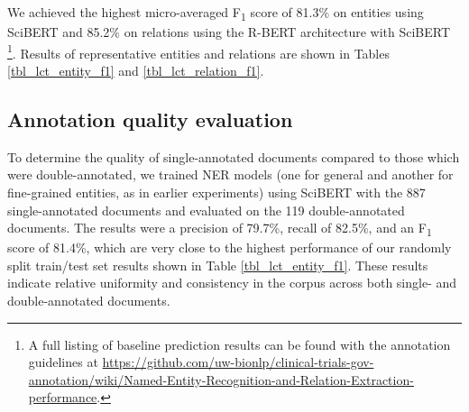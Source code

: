 \documentclass[../main.tex]{subfiles}
\begin{document}
We achieved the highest micro-averaged F\textsubscript{1} score of 81.3\% on entities using SciBERT and 85.2\% on relations using the R-BERT architecture with SciBERT \footnote{A full listing of baseline prediction results can be found with the annotation guidelines at \url{https://github.com/uw-bionlp/clinical-trials-gov-annotation/wiki/Named-Entity-Recognition-and-Relation-Extraction-performance}. }. Results of representative entities and relations are shown in Tables \ref{tbl_lct_entity_f1} and \ref{tbl_lct_relation_f1}.

\begin{table}[tp]
    \centering
    \footnotesize
    
    \caption{\textbf{Baseline entity prediction scores (\%, Precision / Recall / F\textsubscript{1}).} Corpus-level micro-averaged scores are shown in the bottom row. For brevity a representative sample of entities is shown. \textit{Count} refers to the total count of unique spans annotated in the entire corpus. Entities included in the total count and scores but omitted for brevity are \textit{Acuteness, Allergy, Condition-Type, Code, Coreference, Ethnicity, Eq-Operator, Eq-Unit, Indication, Immunization, Insurance, Life-Stage-And-Gender, Organism, Other, Specimen, Study and Provider}.}
    \label{tbl_lct_entity_f1}
\end{table}

\begin{table}
    \centering
    \footnotesize
    
    \caption{\textbf{Baseline relation prediction scores (\%, Precision / Recall / F\textsubscript{1}).} Corpus-level micro-averaged scores are shown in the bottom row. For brevity a representative sample of relations is shown. \textit{Count} refers to the total count annotated in the entire corpus, including relations not shown. The count total excludes general to fine-grained entity relations, which as overlapping spans are not used for relation prediction. Relations included in the total count and scores but omitted for brevity are \textit{Acuteness, Code, Criteria, Except, From, Indication-For, Is-Other, Max-Value, Min-Value, Polarity, Provider, Refers-To, Specimen, Stage, Study-Of and Type}.}
    \label{tbl_lct_relation_f1}
\end{table}

\subsection{Annotation quality evaluation}
To determine the quality of single-annotated documents compared to those which were double-annotated, we trained NER models (one for general and another for fine-grained entities, as in earlier experiments) using SciBERT with the 887 single-annotated documents and evaluated on the 119 double-annotated documents. The results were a precision of 79.7\%, recall of 82.5\%, and an F\textsubscript{1} score of 81.4\%, which are very close to the highest performance of our randomly split train/test set results shown in Table \ref{tbl_lct_entity_f1}. These results indicate relative uniformity and consistency in the corpus across both single- and double-annotated documents.
\end{document}
